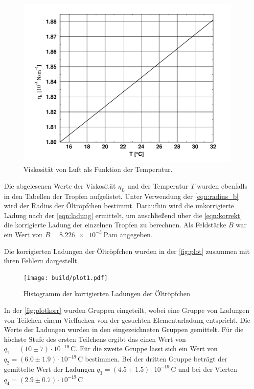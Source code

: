 \begin{figure}[H]
    \centering
	\includegraphics[width=0.75\linewidth]{content/grafik/graph.png}
	\captionsetup{width=0.925\linewidth}
	\caption{Viskosität von Luft als Funktion der Temperatur.\cite{millikan}}
	\label{fig:graph}
\end{figure}

Die abgelesenen Werte der Viskosität $\eta_L$ und der Temperatur $T$ wurden ebenfalls in den Tabellen der Tropfen aufgelistet.
Unter Verwendung der \autoref{eqn:radius_b} wird der Radius der Öltröpfchen bestimmt.
Daraufhin wird die unkorrigierte Ladung nach der \autoref{eqn:ladung} ermittelt, um anschließend 
über die \autoref{eqn:korrekt} die korrigierte Ladung der einzelnen Tropfen zu berechnen. Als Feldstärke $B$ war ein
Wert von $B = \qty{8.226e-3}{\pascal\meter}$ angegeben.

Die korrigierten Ladungen der Öltröpfchen wurden in der \autoref{fig:plot} zusammen mit ihren Fehlern dargestellt.

\begin{figure}[H]
    \centering
    \texttt{[image: build/plot1.pdf]}
    \caption{Histogramm der korrigierten Ladungen der Öltröpfchen}
    \label{fig:plot}
\end{figure}

In der \autoref{fig:plotkorr} wurden Gruppen eingeteilt, wobei eine Gruppe von Ladungen von Teilchen einem Vielfachen von der
gesuchten Elementarladung entspricht. Die Werte der Ladungen wurden in den eingezeichneten Gruppen gemittelt. Für die höchste
Stufe des ersten Teilchens ergibt das einen Wert von $ q_1 = (10 \pm 7) \cdot 10^{-19} \, \mathrm{C}$. Für die zweite Gruppe
lässt sich ein Wert von $q_2 = (6.0 \pm 1.9) \cdot 10^{-19} \, \mathrm{C}$ bestimmen. Bei der dritten Gruppe beträgt der gemittelte 
Wert der Ladungen $q_3 = (4.5 \pm 1.5) \cdot 10^{-19} \, \mathrm{C}$ und bei der Vierten $q_4 = (2.9 \pm 0.7) \cdot 10^{-19} \, \mathrm{C}$

